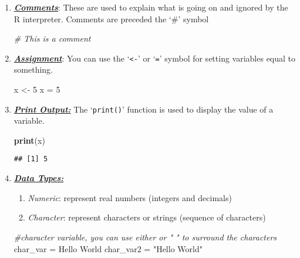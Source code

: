 \documentclass[
]{article}
\newenvironment{Shaded}{\begin{snugshade}}{\end{snugshade}}
\newcommand{\CommentTok}[1]{\textcolor[rgb]{0.56,0.35,0.01}{\textit{#1}}}
\newcommand{\DecValTok}[1]{\textcolor[rgb]{0.00,0.00,0.81}{#1}}
\newcommand{\FunctionTok}[1]{\textcolor[rgb]{0.13,0.29,0.53}{\textbf{#1}}}
\newcommand{\NormalTok}[1]{#1}
\newcommand{\OtherTok}[1]{\textcolor[rgb]{0.56,0.35,0.01}{#1}}
\newcommand{\StringTok}[1]{\textcolor[rgb]{0.31,0.60,0.02}{#1}}
\begin{document}
\begin{enumerate}
\def\labelenumi{\arabic{enumi}.}
\item
  \ul{\textbf{\emph{Comments}}}: These are used to explain what is going
  on and ignored by the R interpreter. Comments are preceded the `\#'
  symbol

\begin{Shaded}
\begin{Highlighting}[]
\CommentTok{\# This is a comment}
\end{Highlighting}
\end{Shaded}
\item
  \ul{\textbf{\emph{Assignment}}}: You can use the
  `\texttt{\textless{}-}' or `\texttt{=}' symbol for setting variables
  equal to something.

\begin{Shaded}
\begin{Highlighting}[]
\NormalTok{x }\OtherTok{\textless{}{-}} \DecValTok{5} 
\NormalTok{x }\OtherTok{=} \DecValTok{5}
\end{Highlighting}
\end{Shaded}
\item
  \ul{\textbf{\emph{Print Output:}}} The `\texttt{print()}' function is
  used to display the value of a variable.

\begin{Shaded}
\begin{Highlighting}[]
\FunctionTok{print}\NormalTok{(x)}
\end{Highlighting}
\end{Shaded}

\begin{verbatim}
## [1] 5
\end{verbatim}
\item
  \ul{\textbf{\emph{Data Types:}}}

  \begin{enumerate}
  \def\labelenumii{\arabic{enumii}.}
  \item
    \emph{Numeric}: represent real numbers (integers and decimals)
  \item
    \emph{Character}: represent characters or strings (sequence of
    characters)
  \end{enumerate}

\begin{Shaded}
\begin{Highlighting}[]
\CommentTok{\#character variable, you can use either \textquotesingle{} \textquotesingle{} or " " to surround the characters }
\NormalTok{char\_var }\OtherTok{=} \StringTok{\textquotesingle{}Hello World\textquotesingle{}}
\NormalTok{char\_var2 }\OtherTok{=} \StringTok{"Hello World"} 


\end{Highlighting}
\end{Shaded}
\end{enumerate}
\end{document}
